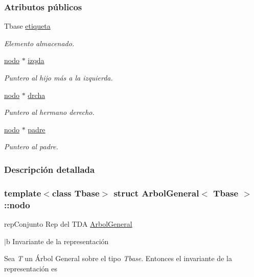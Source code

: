 \subsubsection*{Atributos públicos}
\begin{DoxyCompactItemize}
\item 
Tbase \hyperlink{structArbolGeneral_1_1nodo_ab7223965c5a62aa93895f3decd7a109a}{etiqueta}
\begin{DoxyCompactList}\small\item\em Elemento almacenado. \end{DoxyCompactList}\item 
\hyperlink{structArbolGeneral_1_1nodo}{nodo} $\ast$ \hyperlink{structArbolGeneral_1_1nodo_a3b8075b9fd0dc27c2272ba48bd9a9221}{izqda}
\begin{DoxyCompactList}\small\item\em Puntero al hijo más a la izquierda. \end{DoxyCompactList}\item 
\hyperlink{structArbolGeneral_1_1nodo}{nodo} $\ast$ \hyperlink{structArbolGeneral_1_1nodo_a8d0a58447171461212942f9308ef4f36}{drcha}
\begin{DoxyCompactList}\small\item\em Puntero al hermano derecho. \end{DoxyCompactList}\item 
\hyperlink{structArbolGeneral_1_1nodo}{nodo} $\ast$ \hyperlink{structArbolGeneral_1_1nodo_ab4d70a0179e8450b2842bbf1a6481402}{padre}
\begin{DoxyCompactList}\small\item\em Puntero al padre. \end{DoxyCompactList}\end{DoxyCompactItemize}


\subsubsection{Descripción detallada}
\subsubsection*{template$<$class Tbase$>$\newline
struct Arbol\+General$<$ Tbase $>$\+::nodo}

rep\+Conjunto Rep del T\+DA \hyperlink{classArbolGeneral}{Arbol\+General} 

$\vert$b Invariante de la representación

Sea {\itshape T} un Árbol General sobre el tipo {\itshape Tbase}. Entonces el invariante de la representación es

